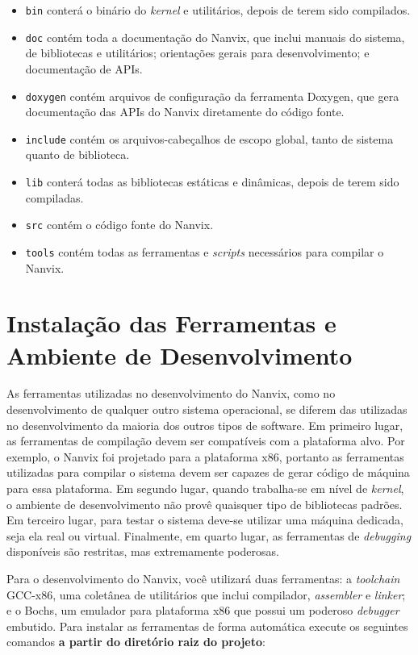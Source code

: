 \documentclass[11pt]{article}
\begin{document}
\begin{itemize}
    \item \texttt{bin} conterá o binário do \textit{kernel} e utilitários, depois de terem sido compilados.
    \item \texttt{doc} contém toda a documentação do Nanvix, que inclui manuais do sistema, de bibliotecas e utilitários; orientações gerais para desenvolvimento; e documentação de APIs.
    \item \texttt{doxygen} contém arquivos de configuração da ferramenta Doxygen, que gera documentação das APIs do Nanvix diretamente do código fonte.
    \item \texttt{include} contém os arquivos-cabeçalhos de escopo global, tanto de sistema quanto de biblioteca.
    \item \texttt{lib} conterá todas as bibliotecas estáticas e dinâmicas, depois de terem sido compiladas.
    \item \texttt{src} contém o código fonte do Nanvix.
    \item \texttt{tools} contém todas as ferramentas e \textit{scripts} necessários para compilar o Nanvix.
\end{itemize}

\section{Instalação das Ferramentas e Ambiente de Desenvolvimento}
\label{sec:ferramentas}

As ferramentas utilizadas no desenvolvimento do Nanvix, como no desenvolvimento de qualquer outro sistema operacional, se diferem das utilizadas no desenvolvimento da maioria dos outros tipos de software. Em primeiro lugar, as ferramentas de compilação devem ser compatíveis com a plataforma alvo. Por exemplo, o Nanvix foi projetado para a plataforma x86, portanto as ferramentas utilizadas para compilar o sistema devem ser capazes de gerar código de máquina para essa plataforma. Em segundo lugar, quando trabalha-se em nível de \textit{kernel}, o ambiente de desenvolvimento não provê quaisquer tipo de bibliotecas padrões. Em terceiro lugar, para testar o sistema deve-se utilizar uma máquina dedicada, seja ela real ou virtual. Finalmente, em quarto lugar, as ferramentas de \textit{debugging} disponíveis são restritas, mas extremamente poderosas.

Para o desenvolvimento do Nanvix, você utilizará duas ferramentas: a \textit{toolchain} GCC-x86, uma coletânea de utilitários que inclui compilador, \textit{assembler} e \textit{linker}; e o Bochs, um emulador para plataforma x86 que possui um poderoso \textit{debugger} embutido. Para instalar as ferramentas de forma automática execute os seguintes comandos \textbf{a partir do diretório raiz do projeto}: \\
\end{document}
